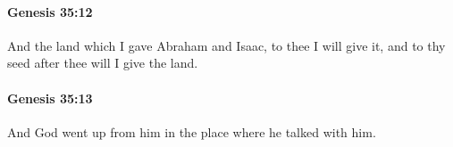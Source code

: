 		\paragraph{Genesis 35:12} %
			\label{GENESIS-35-12}

			And the land which I gave Abraham and Isaac, to thee I will give it, and to thy seed after thee will I give the land.


		\paragraph{Genesis 35:13} %
			\label{GENESIS-35-13}

			And God went up from him in the place where he talked with him.


